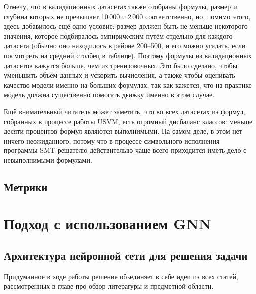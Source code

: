 Отмечу, что в валидационных датасетах также отобраны формулы, размер и глубина которых не превышает 10\,000 и 2\,000 соответственно, но, помимо этого, здесь добавилось ещё одно условие: размер должен быть не меньше некоторого значения, которое подбиралось эмпирическим путём отдельно для каждого датасета (обычно оно находилось в районе 200--500, и его можно угадать, если посмотреть на средний столбец в таблице). Поэтому формулы из валидационных датасетов кажутся больше, чем из тренировочных. Это было сделано, чтобы уменьшить объём данных и ускорить вычисления, а также чтобы оценивать качество модели именно на больших формулах, так как кажется, что на практике модель должна существенно помогать движку именно в этом случае.

Ещё внимательный читатель может заметить, что во всех датасетах из формул, собранных в процессе работы USVM, есть огромный дисбаланс классов: меньше десяти процентов формул являются выполнимыми. На самом деле, в этом нет ничего неожиданного, потому что в процессе символьного исполнения программы SMT-решателю действительно чаще всего приходится иметь дело с невыполнимыми формулами.


\subsection{Метрики}



\newpage

\section{Подход с использованием GNN}

\subsection{Архитектура нейронной сети для решения задачи}

Придуманное в ходе работы решение объединяет в себе идеи из всех статей, рассмотренных в главе про обзор литературы и предметной области.

